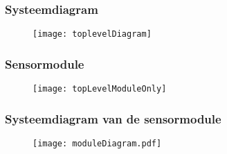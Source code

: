 
\begin{frame}
    \frametitle{Systeemdiagram}

    \begin{figure}
        \centering
        \texttt{[image: toplevelDiagram]}
    \end{figure}

\end{frame}

\begin{frame}
    \frametitle{Sensormodule}

    \begin{figure}
        \centering
        \texttt{[image: topLevelModuleOnly]}
    \end{figure}

\end{frame}



\begin{frame}
    \frametitle{Systeemdiagram van de sensormodule}
    
    \begin{figure}
        \centering
        \texttt{[image: moduleDiagram.pdf]}
    \end{figure}
    
\end{frame}